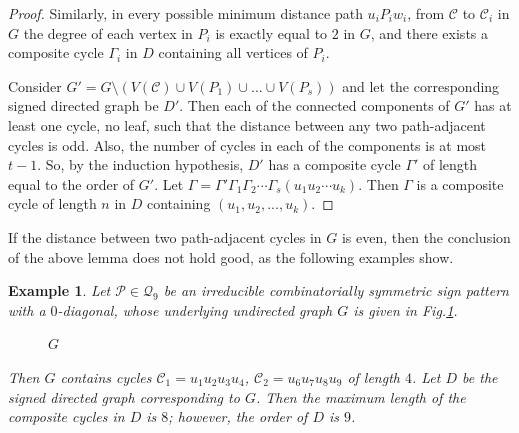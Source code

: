 \documentclass[a4paper, 10pt]{article}
\newtheorem{eg}{Example}[section]
\numberwithin{equation}{section}
\begin{document}
\begin{proof}
	
	Similarly, in every possible minimum distance path $u_iP_iw_i$, from $\mathcal{C}$ to $\mathcal{C}_i$ in $G$ the degree of each vertex in $P_i$ is exactly equal to $2$ in $G$, and there exists a composite cycle $\Gamma_i$ in $D$ containing all vertices of $P_i$. 
	
	Consider $G'=G\setminus (V(\mathcal{C})\cup V(P_1)\cup...\cup V(P_s))$ and let the corresponding signed directed graph be $D'$. Then each of the connected components of $G'$ has at least one cycle, no leaf, such that the distance between any two path-adjacent cycles is odd. Also, the number of cycles in each of the components is at most $t-1$. So, by the induction hypothesis, $D'$ has a composite cycle $\Gamma'$ of length equal to the order of $G'$. Let $\Gamma=\Gamma' \Gamma_1\Gamma_2 \cdots  \Gamma_s (u_1u_2\cdots u_k).$ Then $\Gamma$ is a composite cycle of length $n$ in $D$ containing $(u_1,u_2,...,u_k)$.
\end{proof}

If the distance between two path-adjacent cycles in $G$ is even, then the conclusion of the above lemma does not hold good, as the following examples show. 
\begin{eg}
	Let $\mathcal{P}\in \mathcal{Q}_9$ be an irreducible combinatorially symmetric sign pattern with a $0$-diagonal, whose underlying undirected graph $G$ is given in Fig.\ref{xxfig1}.
	\begin{figure}[H]
		\tikzset{node distance=1cm}
		\centering
		\caption{$G$}
		\label{xxfig1}
	\end{figure} Then $G$ contains cycles $\mathcal{C}_1=u_1u_2u_3u_4$, $\mathcal{C}_2=u_6u_7u_8u_9$ of length $4$. Let $D$ be the signed directed graph corresponding to $G$. Then the maximum length of the composite cycles in $D$ is $8$; however, the order of $D$ is $9$.      
\end{eg}
\end{document}
